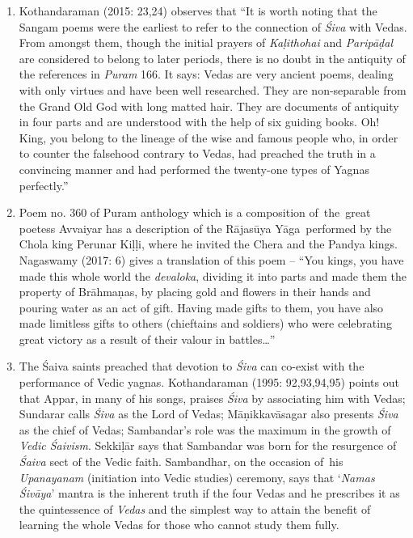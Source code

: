 \begin{enumerate}[{\rm 1.}]
 \item Kothandaraman (2015: 23,24) observes that “It is worth noting that the Sangam poems were the earliest to refer to the connection of \textit{Śiva} with Vedas. From amongst them, though the initial prayers of \textit{Kaḷithohai} and \textit{Paripāḍal} are considered to belong to later periods, there is no doubt in the antiquity of the references in \textit{Puram} 166. It says: Vedas are very ancient poems, dealing with only virtues and have been well researched. They are non-separable from the Grand Old God with long matted hair. They are documents of antiquity in four parts and are understood with the help of six guiding books. Oh! King, you belong to the lineage of the wise and famous people who, in order to counter the falsehood contrary to Vedas, had preached the truth in a convincing manner and had performed the twenty-one types of Yagnas perfectly.”

 \item Poem no. 360 of Puram anthology which is a composition of~the~great poetess Avvaiyar has a description of the Rājasūya Yāga~performed by the Chola king Perunar Kiḷḷi, where he invited the Chera and the Pandya kings. Nagaswamy (2017: 6) gives a translation of this poem – “You kings, you have made this whole world the \textit{devaloka}, dividing it into parts and made them the property of Brāhmaṇas, by placing gold and flowers in their hands and pouring water as an act of gift. Having made gifts to them, you have also made limitless gifts to others (chieftains and soldiers) who were celebrating great victory as a result of their valour in battles…”

 \item The Śaiva saints preached that devotion to \textit{Śiva} can co-exist with the performance of Vedic yagnas. Kothandaraman (1995: 92,93,94,95) points out that Appar, in many of his songs, praises \textit{Śiva} by associating him with Vedas; Sundarar calls \textit{Śiva} as the Lord of Vedas; Māṇikkavāsagar also presents \textit{Śiva} as the chief of Vedas; Sambandar’s role was the maximum in the growth of \textit{Vedic Śaivism}. Sekkiḷār says that Sambandar was born for the resurgence of \textit{Śaiva} sect of the Vedic faith. Sambandhar, on the occasion of~his \textit{Upanayanam} (initiation into Vedic studies) ceremony, says that ‘\textit{Namas Śivāya}’ mantra is the inherent truth if the four Vedas and he prescribes it as the quintessence of \textit{Vedas} and the simplest way to attain the benefit of learning the whole Vedas for those who cannot study them fully.


\end{enumerate}
